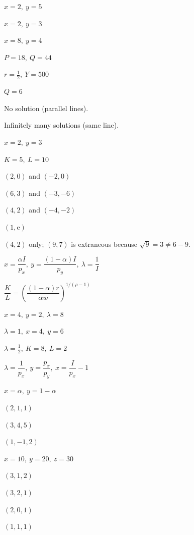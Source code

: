\begin{solutions}
  \item $x=2,\ y=5$
  \item $x=2,\ y=3$
  \item $x=8,\ y=4$
  \item $P=18,\ Q=44$
  \item $r=\tfrac12,\ Y=500$
  \item $Q=6$
  \item No solution (parallel lines).
  \item Infinitely many solutions (same line).
  \item $x=2,\ y=3$
  \item $K=5,\ L=10$
  \item $(2,0)$ and $(-2,0)$
  \item $(6,3)$ and $(-3,-6)$
  \item $(4,2)$ and $(-4,-2)$
  \item $(1,\mathrm{e})$
  \item $(4,2)$ only; $(9,7)$ is extraneous because
        $\sqrt{9}=3\neq 6-9$.
  \item $x=\dfrac{\alpha I}{p_{x}},\ y=\dfrac{(1-\alpha)I}{p_{y}},\
        \lambda=\dfrac{1}{I}$
  \item $\dfrac{K}{L}=\left(\dfrac{(1-\alpha)r}{\alpha w}\right)^{1/(\rho-1)}$
  \item $x=4,\ y=2,\ \lambda=8$
  \item $\lambda=1,\ x=4,\ y=6$
  \item $\lambda=\tfrac12,\ K=8,\ L=2$
  \item $\lambda=\dfrac{1}{p_{x}},\ y=\dfrac{p_{x}}{p_{y}},\
        x=\dfrac{I}{p_{x}}-1$
  \item $x=\alpha,\ y=1-\alpha$
  \item $(2,1,1)$
  \item $(3,4,5)$
  \item $(1,-1,2)$
  \item $x=10,\ y=20,\ z=30$
  \item $(3,1,2)$
  \item $(3,2,1)$
  \item $(2,0,1)$
  \item $(1,1,1)$
\end{solutions}

